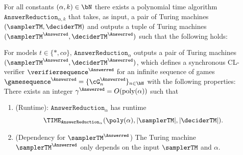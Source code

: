 \begin{proposition} \label{prop:AnswerReduction}
	For all constants $(\alpha,k) \in \bN$ there exists a polynomial time algorithm $\texttt{AnswerReduction}_{\alpha, k}$ that takes, as input, a pair of Turing machines $(\samplerTM, \deciderTM)$ and outputs a tuple of Turing machines $(\samplerTM^{\Answerred}, \deciderTM^{\Answerred})$ such that the following holds:
	
	For models $t \in \{*, co\}$, $\texttt{AnswerReduction}_{\alpha}$ outputs a pair of Turing machines $(\samplerTM^{\Answerred}, \deciderTM^{\Answerred})$,  which defines a synchronous CL-verifier $\verifiersequence^{\Answerred}$ for an infinite sequence of games $\gamesequence^{\Answerred} = \{\cG_n^{\Answerred} \}_{n \in \bN}$ with the following properties: There exists an integer $\gamma^{\Answerred} = O(\text{poly}(\alpha))$ such that
	
	\begin{enumerate}
		\item (Runtime): $\texttt{AnswerReduction}_{\alpha}$ has runtime
		\begin{equation*}
			\TIME_{\texttt{AnswerReduction}_{\alpha}}  (\poly(\alpha), |\samplerTM|, |\deciderTM|). 
		\end{equation*}
		\item (Dependency for $\samplerTM^{\Answerred}$) The Turing machine $\samplerTM^{\Answerred}$ only depends on the input $\samplerTM$ and $\alpha$. 
	\end{enumerate}
	

\end{proposition}
